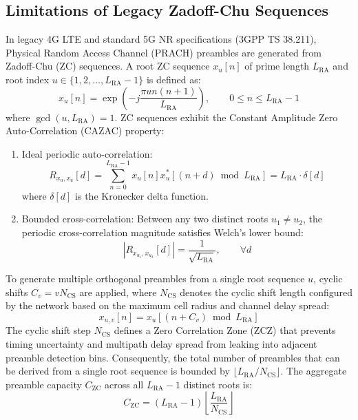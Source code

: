 \subsection{Limitations of Legacy Zadoff-Chu Sequences}
In legacy 4G LTE and standard 5G NR specifications (3GPP TS 38.211), Physical Random Access Channel (PRACH) preambles are generated from Zadoff-Chu (ZC) sequences. A root ZC sequence $x_u[n]$ of prime length $L_{\mathrm{RA}}$ and root index $u \in \{1, 2, \dots, L_{\mathrm{RA}}-1\}$ is defined as:
\begin{equation}
    \label{eq:zc_definition}
    x_u[n] = \exp\left( -j \frac{\pi u n (n + 1)}{L_{\mathrm{RA}}} \right), \qquad 0 \le n \le L_{\mathrm{RA}} - 1
\end{equation}
where $\gcd(u, L_{\mathrm{RA}}) = 1$. ZC sequences exhibit the Constant Amplitude Zero Auto-Correlation (CAZAC) property:
\begin{enumerate}
    \item Ideal periodic auto-correlation:
    \begin{equation}
        R_{x_u, x_u}[d] = \sum_{n=0}^{L_{\mathrm{RA}}-1} x_u[n] x_u^*[(n+d) \bmod L_{\mathrm{RA}}] = L_{\mathrm{RA}} \cdot \delta[d]
    \end{equation}
    where $\delta[d]$ is the Kronecker delta function.
    \item Bounded cross-correlation: Between any two distinct roots $u_1 \ne u_2$, the periodic cross-correlation magnitude satisfies Welch's lower bound:
    \begin{equation}
        |R_{x_{u_1}, x_{u_2}}[d]| = \frac{1}{\sqrt{L_{\mathrm{RA}}}}, \qquad \forall d
    \end{equation}
\end{enumerate}

To generate multiple orthogonal preambles from a single root sequence $u$, cyclic shifts $C_v = v N_{\mathrm{CS}}$ are applied, where $N_{\mathrm{CS}}$ denotes the cyclic shift length configured by the network based on the maximum cell radius and channel delay spread:
\begin{equation}
    x_{u, v}[n] = x_u[(n + C_v) \bmod L_{\mathrm{RA}}]
\end{equation}
The cyclic shift step $N_{\mathrm{CS}}$ defines a Zero Correlation Zone (ZCZ) that prevents timing uncertainty and multipath delay spread from leaking into adjacent preamble detection bins. Consequently, the total number of preambles that can be derived from a single root sequence is bounded by $\lfloor L_{\mathrm{RA}} / N_{\mathrm{CS}} \rfloor$. The aggregate preamble capacity $C_{\mathrm{ZC}}$ across all $L_{\mathrm{RA}} - 1$ distinct roots is:
\begin{equation}
    \label{eq:zc_capacity}
    C_{\mathrm{ZC}} = (L_{\mathrm{RA}} - 1) \left\lfloor \frac{L_{\mathrm{RA}}}{N_{\mathrm{CS}}} \right\rfloor
\end{equation}

